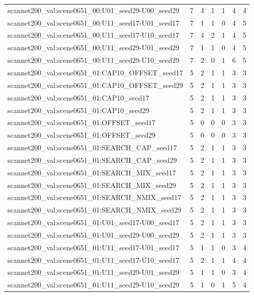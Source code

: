 \begin{table}[t]
\begin{tabular}{lrrrrrr}
scannet200\_val:scene0651\_00:U01\_seed29-U00\_seed29 & 7 & 4 & 1 & 1 & 4 & 4 \\
scannet200\_val:scene0651\_00:U11\_seed17-U01\_seed17 & 7 & 1 & 1 & 0 & 4 & 5 \\
scannet200\_val:scene0651\_00:U11\_seed17-U10\_seed17 & 7 & 4 & 2 & 1 & 4 & 5 \\
scannet200\_val:scene0651\_00:U11\_seed29-U01\_seed29 & 7 & 1 & 1 & 0 & 4 & 5 \\
scannet200\_val:scene0651\_00:U11\_seed29-U10\_seed29 & 7 & 2 & 0 & 1 & 6 & 5 \\
scannet200\_val:scene0651\_01:CAP10\_OFFSET\_seed17 & 5 & 2 & 1 & 1 & 3 & 3 \\
scannet200\_val:scene0651\_01:CAP10\_OFFSET\_seed29 & 5 & 2 & 1 & 1 & 3 & 3 \\
scannet200\_val:scene0651\_01:CAP10\_seed17 & 5 & 2 & 1 & 1 & 3 & 3 \\
scannet200\_val:scene0651\_01:CAP10\_seed29 & 5 & 2 & 1 & 1 & 3 & 3 \\
scannet200\_val:scene0651\_01:OFFSET\_seed17 & 5 & 0 & 0 & 0 & 3 & 3 \\
scannet200\_val:scene0651\_01:OFFSET\_seed29 & 5 & 0 & 0 & 0 & 3 & 3 \\
scannet200\_val:scene0651\_01:SEARCH\_CAP\_seed17 & 5 & 2 & 1 & 1 & 3 & 3 \\
scannet200\_val:scene0651\_01:SEARCH\_CAP\_seed29 & 5 & 2 & 1 & 1 & 3 & 3 \\
scannet200\_val:scene0651\_01:SEARCH\_MIX\_seed17 & 5 & 2 & 1 & 1 & 3 & 3 \\
scannet200\_val:scene0651\_01:SEARCH\_MIX\_seed29 & 5 & 2 & 1 & 1 & 3 & 3 \\
scannet200\_val:scene0651\_01:SEARCH\_NMIX\_seed17 & 5 & 2 & 1 & 1 & 3 & 3 \\
scannet200\_val:scene0651\_01:SEARCH\_NMIX\_seed29 & 5 & 2 & 1 & 1 & 3 & 3 \\
scannet200\_val:scene0651\_01:U01\_seed17-U00\_seed17 & 5 & 2 & 1 & 1 & 3 & 3 \\
scannet200\_val:scene0651\_01:U01\_seed29-U00\_seed29 & 5 & 2 & 1 & 1 & 3 & 3 \\
scannet200\_val:scene0651\_01:U11\_seed17-U01\_seed17 & 5 & 1 & 1 & 0 & 3 & 4 \\
scannet200\_val:scene0651\_01:U11\_seed17-U10\_seed17 & 5 & 2 & 1 & 1 & 4 & 4 \\
scannet200\_val:scene0651\_01:U11\_seed29-U01\_seed29 & 5 & 1 & 1 & 0 & 3 & 4 \\
scannet200\_val:scene0651\_01:U11\_seed29-U10\_seed29 & 5 & 1 & 0 & 1 & 5 & 4 \\

\end{tabular}
\end{table}

